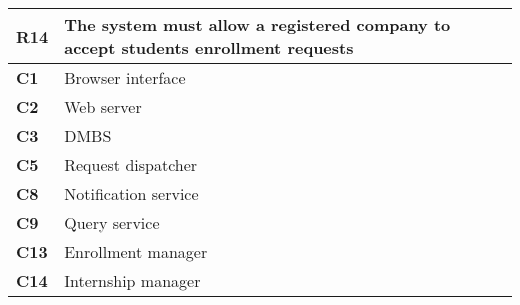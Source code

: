\begin{table}[H]
    \centering
    \begin{tabular}{|l|m{10cm}|}
        \hline \textbf{R14} & The system must allow a registered company to accept students enrollment requests \\
        \hline \textbf{C1} & Browser interface \\
        \hline \textbf{C2} & Web server \\
        \hline \textbf{C3} & DMBS \\
        \hline \textbf{C5} & Request dispatcher \\
        \hline \textbf{C8} & Notification service \\
        \hline \textbf{C9} & Query service \\
        \hline \textbf{C13} & Enrollment manager \\
        \hline \textbf{C14} & Internship manager \\
        \hline
    \end{tabular}
\end{table}

